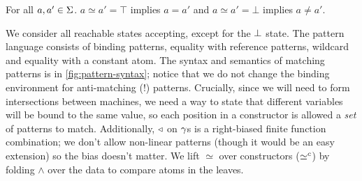 \begin{property}
  For all $a, a' \in \Sigma$. $a \simeq a' = \top$ implies $a = a'$ and $a \simeq a' = \bot$ implies $a \neq a'$.
\end{property}
%
We consider all reachable states accepting, except for the $\bot$ state.
%
The pattern language consists of binding patterns, equality with reference patterns, wildcard and equality with a constant atom.
%
The syntax and semantics of matching patterns is in \autoref{fig:pattern-syntax}; notice that we do not change the binding environment for anti-matching ($!$) patterns.
%
Crucially, since we will need to form intersections between machines, we need a way to state that different variables will be bound to the same value, so each position in a constructor is allowed a \emph{set} of patterns to match.
%
Additionally, $\triangleleft$ on $\gamma$s is a right-biased finite function combination; we don't allow non-linear patterns (though it would be an easy extension) so the bias doesn't matter.
%
We lift $\simeq$ over constructors ($\simeq^c$) by folding $\wedge$ over the data to compare atoms in the leaves.
%
